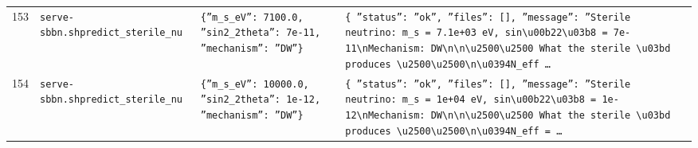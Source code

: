 \documentclass[11pt,a4paper]{article}
\begin{document}
\begin{longtable}{@{}p{}p{}p{}p{}@{}}
153 & \texttt{serve-sbbn.sh}\newline\texttt{predict\_\allowbreak{}sterile\_\allowbreak{}nu} & \texttt{\{''m\_\allowbreak{}s\_\allowbreak{}eV'':\allowbreak{} 7100.0,\allowbreak{} ''sin2\_\allowbreak{}2theta'':\allowbreak{} 7e-11,\allowbreak{} ''mechanism'':\allowbreak{} ''DW''\}\allowbreak{}} & \texttt{\{   ''status'':\allowbreak{} ''ok'',\allowbreak{}   ''files'':\allowbreak{} []\allowbreak{},\allowbreak{}   ''message'':\allowbreak{} ''Sterile neutrino:\allowbreak{} m\_\allowbreak{}s =\allowbreak{} 7.1e+03 eV,\allowbreak{} sin\textbackslash{}\allowbreak{}u00b22\textbackslash{}\allowbreak{}u03b8 =\allowbreak{} 7e-11\textbackslash{}\allowbreak{}nMechanism:\allowbreak{} DW\textbackslash{}\allowbreak{}n\textbackslash{}\allowbreak{}n\textbackslash{}\allowbreak{}u2500\textbackslash{}\allowbreak{}u2500 What the sterile \textbackslash{}\allowbreak{}u03bd produces \textbackslash{}\allowbreak{}u2500\textbackslash{}\allowbreak{}u2500\textbackslash{}\allowbreak{}n\textbackslash{}\allowbreak{}u0394N\_\allowbreak{}eff \ldots{}\allowbreak{}} \\
154 & \texttt{serve-sbbn.sh}\newline\texttt{predict\_\allowbreak{}sterile\_\allowbreak{}nu} & \texttt{\{''m\_\allowbreak{}s\_\allowbreak{}eV'':\allowbreak{} 10000.0,\allowbreak{} ''sin2\_\allowbreak{}2theta'':\allowbreak{} 1e-12,\allowbreak{} ''mechanism'':\allowbreak{} ''DW''\}\allowbreak{}} & \texttt{\{   ''status'':\allowbreak{} ''ok'',\allowbreak{}   ''files'':\allowbreak{} []\allowbreak{},\allowbreak{}   ''message'':\allowbreak{} ''Sterile neutrino:\allowbreak{} m\_\allowbreak{}s =\allowbreak{} 1e+04 eV,\allowbreak{} sin\textbackslash{}\allowbreak{}u00b22\textbackslash{}\allowbreak{}u03b8 =\allowbreak{} 1e-12\textbackslash{}\allowbreak{}nMechanism:\allowbreak{} DW\textbackslash{}\allowbreak{}n\textbackslash{}\allowbreak{}n\textbackslash{}\allowbreak{}u2500\textbackslash{}\allowbreak{}u2500 What the sterile \textbackslash{}\allowbreak{}u03bd produces \textbackslash{}\allowbreak{}u2500\textbackslash{}\allowbreak{}u2500\textbackslash{}\allowbreak{}n\textbackslash{}\allowbreak{}u0394N\_\allowbreak{}eff =\allowbreak{} \ldots{}\allowbreak{}} \\

\end{longtable}
\end{document}
